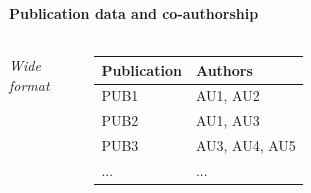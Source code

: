 \documentclass[8pt]{beamer}
\begin{document}
\begin{frame}
\frametitle{\insertsection}
\framesubtitle{Publication data and co-authorship}

\begin{columns}[c]

\centering
\textit{Wide format}

\begin{table}
\begin{tabular}{|l|l|}
\hline
Publication  & Authors \\
\hline
PUB1       & AU1, AU2\\
PUB2       & AU1, AU3 \\
PUB3       & AU3, AU4, AU5\\
...          & ...\\
\hline
\end{tabular}
\end{table}



\end{columns}



\end{frame}

\end{document}
